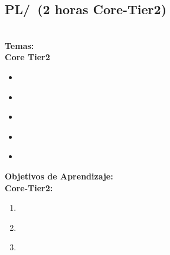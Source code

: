 \subsection{PL/\PLEventDrivenandReactiveProgramming~(2 horas Core-Tier2)}\label{sec:BOK:PLEventDrivenandReactiveProgramming}
\PLEventDrivenandReactiveProgrammingDescription\\
\noindent \textbf{Temas:}\\
\noindent \textbf{Core Tier2}
\begin{itemize}
	\item \PLEventDrivenandReactiveProgrammingTopicEvents\label{sec:BOK:PLEventDrivenandReactiveProgrammingTopicEvents}
	\item \PLEventDrivenandReactiveProgrammingTopicCanonical\label{sec:BOK:PLEventDrivenandReactiveProgrammingTopicCanonical}
	\item \PLEventDrivenandReactiveProgrammingTopicUsingA\label{sec:BOK:PLEventDrivenandReactiveProgrammingTopicUsingA}
	\item \PLEventDrivenandReactiveProgrammingTopicExternally\label{sec:BOK:PLEventDrivenandReactiveProgrammingTopicExternally}
	\item \PLEventDrivenandReactiveProgrammingTopicSeparation\label{sec:BOK:PLEventDrivenandReactiveProgrammingTopicSeparation}
\end{itemize}


\noindent \textbf{Objetivos de Aprendizaje:}\\
\noindent \textbf{Core-Tier2:}
\begin{enumerate}
	\setcounter{enumi}{0}
	\item \PLEventDrivenandReactiveProgrammingLOWriteEvent\xspace[\PLEventDrivenandReactiveProgrammingLOWriteEventLevel]\label{sec:BOK:PLEventDrivenandReactiveProgrammingLOWriteEvent}
	\item \PLEventDrivenandReactiveProgrammingLOExplainWhyDriven\xspace[\PLEventDrivenandReactiveProgrammingLOExplainWhyDrivenLevel]\label{sec:BOK:PLEventDrivenandReactiveProgrammingLOExplainWhyDriven}
	\item \PLEventDrivenandReactiveProgrammingLODescribeAn\xspace[\PLEventDrivenandReactiveProgrammingLODescribeAnLevel]\label{sec:BOK:PLEventDrivenandReactiveProgrammingLODescribeAn}
\end{enumerate}


